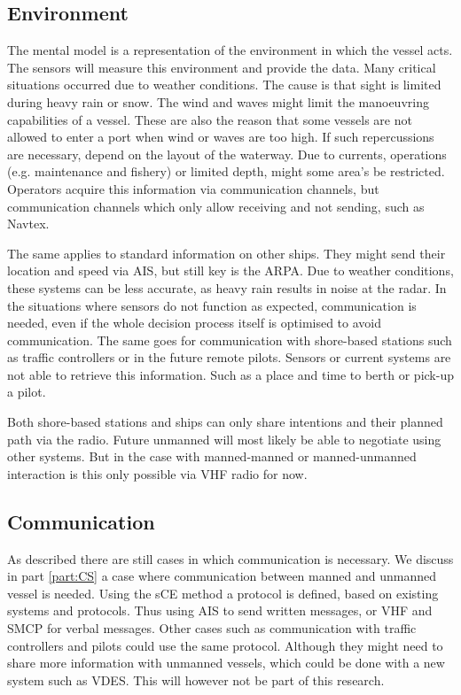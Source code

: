 \subsection{Environment}
The mental model is a representation of the environment in which the vessel acts. The sensors will measure this environment and provide the data. Many critical situations occurred due to weather conditions. The cause is that sight is limited during heavy rain or snow. The wind and waves might limit the manoeuvring capabilities of a vessel. These are also the reason that some vessels are not allowed to enter a port when wind or waves are too high.
If such repercussions are necessary, depend on the layout of the waterway. Due to currents, operations (e.g. maintenance and fishery) or limited depth, might some area's be restricted. Operators acquire this information via communication channels, but communication channels which only allow receiving and not sending, such as \acf{Navtex}.

The same applies to standard information on other ships. They might send their location and speed via \ac{AIS}, but still key is the \ac{ARPA}. Due to weather conditions, these systems can be less accurate, as heavy rain results in noise at the radar. In the situations where sensors do not function as expected, communication is needed, even if the whole decision process itself is optimised to avoid communication.
The same goes for communication with shore-based stations such as traffic controllers or in the future remote pilots. Sensors or current systems are not able to retrieve this information. Such as a place and time to berth or pick-up a pilot.

Both shore-based stations and ships can only share intentions and their planned path via the radio. Future unmanned will most likely be able to negotiate using other systems. But in the case with manned-manned or manned-unmanned interaction is this only possible via \ac{VHF} radio for now.

\newpage

\subsection{Communication}
As described there are still cases in which communication is necessary. We discuss in part \ref{part:CS} a case where communication between manned and unmanned vessel is needed. Using the \acf{sCE} method a protocol is defined, based on existing systems and protocols. Thus using \ac{AIS} to send written messages, or \ac{VHF} and \ac{SMCP} for verbal messages. 
Other cases such as communication with traffic controllers and pilots could use the same protocol. Although they might need to share more information with unmanned vessels, which could be done with a new system such as \ac{VDES}. This will however not be part of this research.
